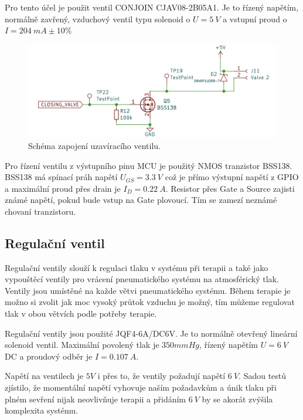 Pro tento účel je použit ventil CONJOIN CJAV08-2B05A1. Je to řízený napětím, normálně zavřený, vzduchový ventil typu solenoid  o $U = 5 \ V$ a vstupní proud o $I = 204 \ mA \pm 10\% $ \cite{cite:UzaviraciVentil}

\begin{figure}[H]
    \includegraphics[width=0.9\linewidth]{pictures/closing_valve_driver.jpg}
    \caption{Schéma zapojení uzavíracího ventilu.}
    \label{fig:closing_valve_driver}
\end{figure}

Pro řízení ventilu z výstupního pinu MCU je použitý NMOS tranzistor BSS138. BSS138 má spínací práh napětí $U_{GS} = 3.3 \ V$ což je přímo výstupní napětí z GPIO a maximální proud přes drain je $I_D = 0.22 \ A$. Resistor přes Gate a Source zajisti známé napětí, pokud bude vstup na Gate plovoucí. Tím se zamezí neznámé chovaní tranzistoru.

\subsection{Regulační ventil}
Regulační ventily slouží k regulaci tlaku v systému při terapii a také jako vypouštěcí ventily pro vrácení pneumatického systému na atmosférický tlak. Ventily jsou umístěné na každe větvi pneumatického systému. Během terapie je možno si zvolit jak moc vysoký průtok vzduchu je možný, tím můžeme regulovat tlak v obou větvích podle potřeby terapie. \par

Regulační ventily jsou použité JQF4-6A/DC6V. Je to normálně otevřený lineární solenoid ventil. Maximální povolený tlak je $350mmHg$, řízený napětím $U = 6 \ V$ DC a proudový odběr je $I = 0.107 \ A$.\par

Napětí na ventilech je $5V$ i přes to, že ventily požadují napětí $6 \ V$. Sadou testů zjístilo, že momentální napětí vyhovuje naším požadavkům a únik tlaku při plném sevření nijak neovlivňuje terapii a přidáním $6 \ V$ by se akorát zvýšila komplexita systému.

